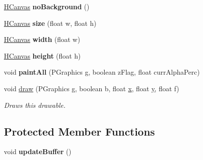 \begin{DoxyCompactItemize}
\item 
\hypertarget{classhype_1_1drawable_1_1_h_canvas_aed8e13a4a6aba9c2ac70fd1366c90b18}{\hyperlink{classhype_1_1drawable_1_1_h_canvas}{H\-Canvas} {\bfseries no\-Background} ()}\label{classhype_1_1drawable_1_1_h_canvas_aed8e13a4a6aba9c2ac70fd1366c90b18}

\item 
\hypertarget{classhype_1_1drawable_1_1_h_canvas_aa23f93ad22eb3aea5810fc337411d310}{\hyperlink{classhype_1_1drawable_1_1_h_canvas}{H\-Canvas} {\bfseries size} (float w, float h)}\label{classhype_1_1drawable_1_1_h_canvas_aa23f93ad22eb3aea5810fc337411d310}

\item 
\hypertarget{classhype_1_1drawable_1_1_h_canvas_a3d44daed96f1b010848c73ee31f3a103}{\hyperlink{classhype_1_1drawable_1_1_h_canvas}{H\-Canvas} {\bfseries width} (float w)}\label{classhype_1_1drawable_1_1_h_canvas_a3d44daed96f1b010848c73ee31f3a103}

\item 
\hypertarget{classhype_1_1drawable_1_1_h_canvas_a5782a46d0b847bdd03f13034bddbcfbc}{\hyperlink{classhype_1_1drawable_1_1_h_canvas}{H\-Canvas} {\bfseries height} (float h)}\label{classhype_1_1drawable_1_1_h_canvas_a5782a46d0b847bdd03f13034bddbcfbc}

\item 
\hypertarget{classhype_1_1drawable_1_1_h_canvas_ae1ff06388948aa565e2f916b2d25adf6}{void {\bfseries paint\-All} (P\-Graphics g, boolean z\-Flag, float curr\-Alpha\-Perc)}\label{classhype_1_1drawable_1_1_h_canvas_ae1ff06388948aa565e2f916b2d25adf6}

\item 
void \hyperlink{classhype_1_1drawable_1_1_h_canvas_a1eea5f31b38c72d369cc4797d61a026c}{draw} (P\-Graphics g, boolean b, float \hyperlink{classhype_1_1drawable_1_1_h_drawable_aae828fe1677025d019df207f62771def}{x}, float \hyperlink{classhype_1_1drawable_1_1_h_drawable_a47920e2ad0509a57687a687044a2f2b6}{y}, float f)
\begin{DoxyCompactList}\small\item\em Draws this drawable. \end{DoxyCompactList}\end{DoxyCompactItemize}
\subsection*{Protected Member Functions}
\begin{DoxyCompactItemize}
\item 
\hypertarget{classhype_1_1drawable_1_1_h_canvas_af03fa8512ff9955433a25e265929f6ae}{void {\bfseries update\-Buffer} ()}\label{classhype_1_1drawable_1_1_h_canvas_af03fa8512ff9955433a25e265929f6ae}

\end{DoxyCompactItemize}
